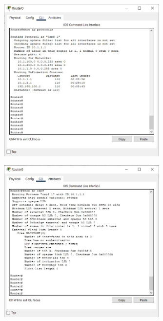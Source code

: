 \documentclass{article}
\begin{document}
\begin{figure}[H]
    \centering
    \includegraphics[width=0.75\textwidth]{figures/21.jpg}
    \caption{}
    \label{fig:fig1}
\end{figure}
\begin{figure}[H]
    \centering
    \includegraphics[width=0.75\textwidth]{figures/22.jpg}
    \caption{}
    \label{fig:fig1}
\end{figure}
\end{document}
